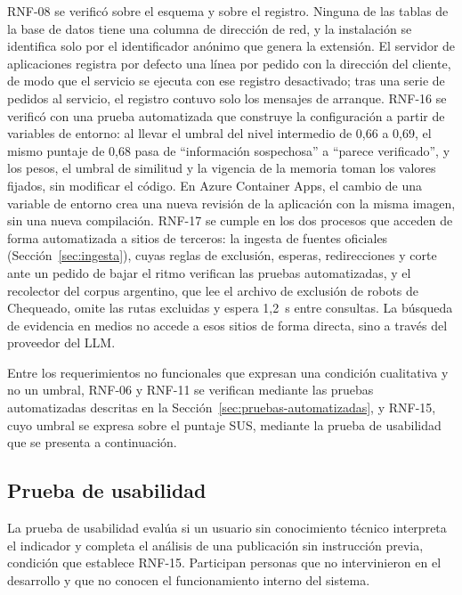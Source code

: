 RNF-08 se verificó sobre el esquema y sobre el registro. Ninguna de las tablas de la base de datos tiene una columna de dirección de red, y la instalación se identifica solo por el identificador anónimo que genera la extensión. El servidor de aplicaciones registra por defecto una línea por pedido con la dirección del cliente, de modo que el servicio se ejecuta con ese registro desactivado; tras una serie de pedidos al servicio, el registro contuvo solo los mensajes de arranque. RNF-16 se verificó con una prueba automatizada que construye la configuración a partir de variables de entorno: al llevar el umbral del nivel intermedio de 0,66 a 0,69, el mismo puntaje de 0,68 pasa de \enquote{información sospechosa} a \enquote{parece verificado}, y los pesos, el umbral de similitud y la vigencia de la memoria toman los valores fijados, sin modificar el código. En Azure Container Apps, el cambio de una variable de entorno crea una nueva revisión de la aplicación con la misma imagen, sin una nueva compilación. RNF-17 se cumple en los dos procesos que acceden de forma automatizada a sitios de terceros: la ingesta de fuentes oficiales (Sección~\ref{sec:ingesta}), cuyas reglas de exclusión, esperas, redirecciones y corte ante un pedido de bajar el ritmo verifican las pruebas automatizadas, y el recolector del corpus argentino, que lee el archivo de exclusión de robots de Chequeado, omite las rutas excluidas y espera 1,2~s entre consultas. La búsqueda de evidencia en medios no accede a esos sitios de forma directa, sino a través del proveedor del LLM.

Entre los requerimientos no funcionales que expresan una condición cualitativa y no un umbral, RNF-06 y RNF-11 se verifican mediante las pruebas automatizadas descritas en la Sección~\ref{sec:pruebas-automatizadas}, y RNF-15, cuyo umbral se expresa sobre el puntaje SUS, mediante la prueba de usabilidad que se presenta a continuación.

\subsection{Prueba de usabilidad}
\label{sec:usabilidad}

La prueba de usabilidad evalúa si un usuario sin conocimiento técnico interpreta el indicador y completa el análisis de una publicación sin instrucción previa, condición que establece RNF-15. Participan personas que no intervinieron en el desarrollo y que no conocen el funcionamiento interno del sistema.

